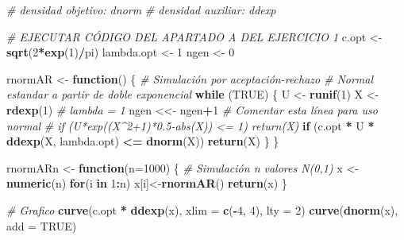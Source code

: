 \documentclass[
]{book}
\newenvironment{Shaded}{\begin{snugshade}}{\end{snugshade}}
\newcommand{\CommentTok}[1]{\textcolor[rgb]{0.56,0.35,0.01}{\textit{#1}}}
\newcommand{\ControlFlowTok}[1]{\textcolor[rgb]{0.13,0.29,0.53}{\textbf{#1}}}
\newcommand{\DataTypeTok}[1]{\textcolor[rgb]{0.13,0.29,0.53}{#1}}
\newcommand{\DecValTok}[1]{\textcolor[rgb]{0.00,0.00,0.81}{#1}}
\newcommand{\KeywordTok}[1]{\textcolor[rgb]{0.13,0.29,0.53}{\textbf{#1}}}
\newcommand{\NormalTok}[1]{#1}
\newcommand{\OperatorTok}[1]{\textcolor[rgb]{0.81,0.36,0.00}{\textbf{#1}}}
\newcommand{\OtherTok}[1]{\textcolor[rgb]{0.56,0.35,0.01}{#1}}
\newcommand{\StringTok}[1]{\textcolor[rgb]{0.31,0.60,0.02}{#1}}
\theoremstyle{break}
\theoremstyle{definition}
\theoremstyle{definition}
\theoremstyle{definition}
\theoremstyle{remark}
\begin{document}
\begin{Shaded}
\begin{Highlighting}[]
\CommentTok{# densidad objetivo: dnorm}
\CommentTok{# densidad auxiliar: ddexp}

\CommentTok{# EJECUTAR CÓDIGO DEL APARTADO A DEL EJERCICIO 1}
\NormalTok{c.opt <-}\StringTok{ }\KeywordTok{sqrt}\NormalTok{(}\DecValTok{2}\OperatorTok{*}\KeywordTok{exp}\NormalTok{(}\DecValTok{1}\NormalTok{)}\OperatorTok{/}\NormalTok{pi)}
\NormalTok{lambda.opt <-}\StringTok{ }\DecValTok{1}
\NormalTok{ngen <-}\StringTok{ }\DecValTok{0}

\NormalTok{rnormAR <-}\StringTok{ }\ControlFlowTok{function}\NormalTok{() \{}
\CommentTok{# Simulación por aceptación-rechazo}
\CommentTok{# Normal estandar a partir de doble exponencial}
  \ControlFlowTok{while}\NormalTok{ (}\OtherTok{TRUE}\NormalTok{) \{}
\NormalTok{    U <-}\StringTok{ }\KeywordTok{runif}\NormalTok{(}\DecValTok{1}\NormalTok{)}
\NormalTok{    X <-}\StringTok{ }\KeywordTok{rdexp}\NormalTok{(}\DecValTok{1}\NormalTok{) }\CommentTok{# lambda = 1}
\NormalTok{    ngen <<-}\StringTok{ }\NormalTok{ngen}\OperatorTok{+}\DecValTok{1} \CommentTok{# Comentar esta línea para uso normal}
    \CommentTok{# if (U*exp((X^2+1)*0.5-abs(X)) <= 1) return(X)}
    \ControlFlowTok{if}\NormalTok{ (c.opt }\OperatorTok{*}\StringTok{ }\NormalTok{U }\OperatorTok{*}\StringTok{ }\KeywordTok{ddexp}\NormalTok{(X, lambda.opt) }\OperatorTok{<=}\StringTok{ }\KeywordTok{dnorm}\NormalTok{(X)) }\KeywordTok{return}\NormalTok{(X)}
\NormalTok{  \}}
\NormalTok{\}}

\NormalTok{rnormARn <-}\StringTok{ }\ControlFlowTok{function}\NormalTok{(}\DataTypeTok{n=}\DecValTok{1000}\NormalTok{) \{}
\CommentTok{# Simulación n valores N(0,1)}
\NormalTok{    x <-}\StringTok{ }\KeywordTok{numeric}\NormalTok{(n)}
    \ControlFlowTok{for}\NormalTok{(i }\ControlFlowTok{in} \DecValTok{1}\OperatorTok{:}\NormalTok{n) x[i]<-}\KeywordTok{rnormAR}\NormalTok{()}
    \KeywordTok{return}\NormalTok{(x)}
\NormalTok{\}}

\CommentTok{# Grafico}
\KeywordTok{curve}\NormalTok{(c.opt }\OperatorTok{*}\StringTok{ }\KeywordTok{ddexp}\NormalTok{(x), }\DataTypeTok{xlim =} \KeywordTok{c}\NormalTok{(}\OperatorTok{-}\DecValTok{4}\NormalTok{, }\DecValTok{4}\NormalTok{), }\DataTypeTok{lty =} \DecValTok{2}\NormalTok{)}
\KeywordTok{curve}\NormalTok{(}\KeywordTok{dnorm}\NormalTok{(x), }\DataTypeTok{add =} \OtherTok{TRUE}\NormalTok{)}
\end{Highlighting}
\end{Shaded}
\end{document}
